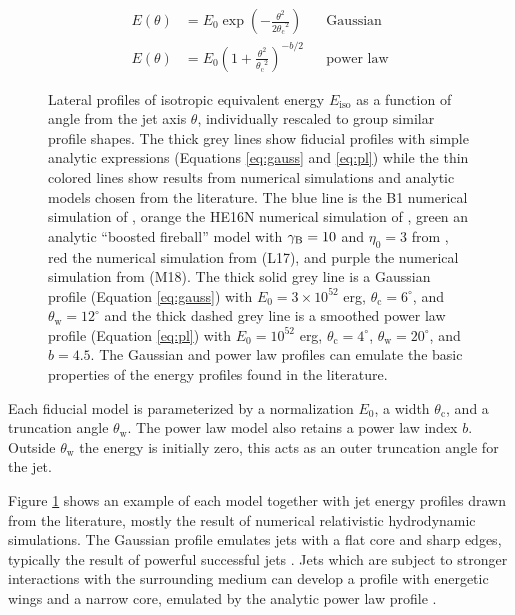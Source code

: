 \documentclass[twocolumn]{aastex62}
\newcommand{\thW}{\ensuremath{\theta_{\mathrm{w}}}}
\newcommand{\thC}{\ensuremath{\theta_{\mathrm{c}}}}
\newcommand{\Eiso}{\ensuremath{E_{\mathrm{iso}}}}
\begin{document}
\begin{align}
	E(\theta) &= E_0 \exp\left(-\frac{\theta^2}{2\thC^2}\right)  && \text{Gaussian} \label{eq:gauss}\\
	E(\theta) &= E_0 \left(1 + \frac{\theta^2}{\thC^2} \right)^{-b/2}  && \text{power law} \label{eq:pl}
\end{align}

%
%

\begin{figure}
	\caption{Lateral profiles of isotropic equivalent energy $\Eiso$ as a function of angle from the jet axis $\theta$, individually rescaled to group similar profile shapes.  The thick grey lines show fiducial profiles with simple analytic expressions (Equations \eqref{eq:gauss} and \eqref{eq:pl}) while the thin colored lines show results from numerical simulations and analytic models chosen from the literature.  The blue line is the B1 numerical simulation of \cite{Aloy:2005aa}, orange the HE16N numerical simulation of \cite{Mizuta:2009aa}, green an analytic ``boosted fireball'' model with $\gamma_{\rm{B}}=10$ and $\eta_0=3$ from \cite{Duffell:2013aa}, red the numerical simulation from \cite{Lazzati:2017aa} (L17), and purple the numerical simulation from \cite{Margutti:2018aa} (M18).  The thick solid grey line is a Gaussian profile (Equation \eqref{eq:gauss}) with $E_0 = 3\times 10^{52}$ erg, $\thC = 6^\circ$, and $\thW=12^\circ$ and the thick dashed grey line is a smoothed power law profile (Equation \eqref{eq:pl}) with $E_0 = 10^{52}$ erg, $\thC = 4^\circ$, $\thW=20^\circ$, and $b=4.5$.  The Gaussian and power law profiles can emulate the basic properties of the energy profiles found in the literature. \label{fig:jetStruct}}
\end{figure}

Each fiducial model is parameterized by a normalization $E_0$, a width $\thC$, and a truncation angle $\thW$.  The power law model also retains a power law index $b$.  Outside $\thW$ the energy is initially zero, this acts as an outer truncation angle for the jet.   

Figure \ref{fig:jetStruct} shows an example of each model together with jet energy profiles drawn from the literature, mostly the result of numerical relativistic hydrodynamic simulations.  The Gaussian profile emulates jets with a flat core and sharp edges, typically the result of powerful successful jets \citep{Aloy:2005aa, Margutti:2018aa}.  Jets which are subject to stronger interactions with the surrounding medium can develop a profile with energetic wings and a narrow core, emulated by the analytic power law profile \citep{Mizuta:2009aa, Duffell:2013aa, Lazzati:2017aa}.  
\end{document}
